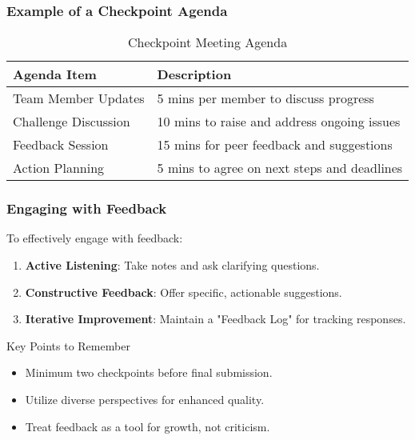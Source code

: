 \documentclass{beamer}
\begin{document}
\begin{frame}[fragile]
    \frametitle{Example of a Checkpoint Agenda}
    \begin{table}[]
        \centering
        \begin{tabular}{|l|l|}
            \hline
            \textbf{Agenda Item} & \textbf{Description} \\ \hline
            Team Member Updates & 5 mins per member to discuss progress \\ \hline
            Challenge Discussion & 10 mins to raise and address ongoing issues \\ \hline
            Feedback Session & 15 mins for peer feedback and suggestions \\ \hline
            Action Planning & 5 mins to agree on next steps and deadlines \\ \hline
        \end{tabular}
        \caption{Checkpoint Meeting Agenda}
    \end{table}
\end{frame}

\begin{frame}[fragile]
    \frametitle{Engaging with Feedback}
    To effectively engage with feedback:
    \begin{enumerate}
        \item \textbf{Active Listening}: Take notes and ask clarifying questions.
        \item \textbf{Constructive Feedback}: Offer specific, actionable suggestions.
        \item \textbf{Iterative Improvement}: Maintain a "Feedback Log" for tracking responses.
    \end{enumerate}
    \begin{block}{Key Points to Remember}
        \begin{itemize}
            \item Minimum two checkpoints before final submission.
            \item Utilize diverse perspectives for enhanced quality.
            \item Treat feedback as a tool for growth, not criticism.
        \end{itemize}
    \end{block}
\end{frame}
\end{document}
